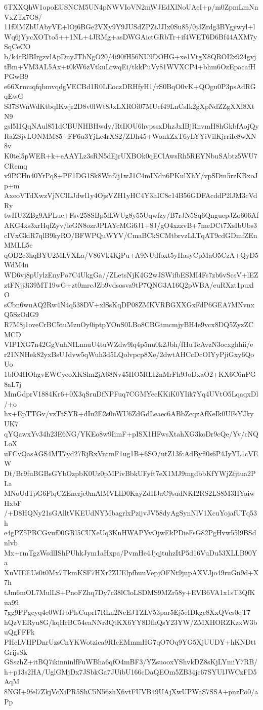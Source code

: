 6TXXQhW1opoEUSNCM5UN4pNWVIoVN2mWJEdXlNoUAeI+p/m0ZpmLmNnVxZTx7G8/
11f0lMZbUAbyVE+lOj6BGe2VXy9Y9JUSdZPZiJJIx0Su85/0j3Zrdg3BYgywyl+l
Wq6jYycXOTto5++1NL+4JRMg+asDWGAictGRbTr+if4WET6D6Bf44AXM7ySqCeCO
b/k4rRlBIrgzvlApDnyJThNgO20/4i90fH56NU9DOHG+xe1VtgX8QROI2z924gvj
tBm+VM3AL5Ax+t0kW6zVtkuLrwqEi/tkkPuVy81WVXCP4+bhm6OzEpacafHPGwB9
e66XrmuqfqbmvqdgVECBd1R0LEoczDRHfyH1/rS0BqO0vK+QOgu0P3psAdRGqEwG
S37SWnWdKtbqIKwjr2D8v0lWt8JxLXROi07MUef49LnCsIk2gXpNdZZgXXl8XtN9
gsl5I1QqNAul851dCBUNHBHwdy/RtIlOU6hvpssxDhzJxIBjRnvmH8hGkbfAojQy
RaZSjvLONMM85+FF6u3YjLe4rXS2/ZDh45+WonkZxT6yLYYiVilKjrriIc8wXN8v
K0tel5pWER+k+eAAYLz3sRN5dEjrUXBOk0qEClAwsRh5REYNbuSAbtz5WU7CRemq
v9PCHn40YrPq8+PF1DG1Sk8Wnf7j1wJ1C4mINdn6PKulXhY/vpSDm5rzKBxoJp+m
AxeoVTdXwzVjNCILJdwl1y4OjsVZH1yHC4Y3hIC8c14B56GDFAcddP2lJM3cVdRy
twHU3ZBg9APLue+Fsv258SBp5lLWUg8y55Uqwfzy/B7rJN5Sq6QnguepJZo606Af
AKG4xs3xrHqfZyv/leGN8ozrJPIAYcMGi6J1+8J/gO4xzzvB+7meDCt7XsIbUbs3
cIVxGkiR7qlB9kyRO/BFWPQuWYV/CmaBCkSCMtbrvzLLTqAT9cdGDmfZEnMMLL5c
qOD2c3hqBYU2MLVXLa/V86Vk4KjPu+A9NUdfoxt5yHasyCpMaO5CzA+QyD5WdM4n
WD6vj8pUylzEnyPo7C4UkgGa//ZLetsNjK4G2wJSWifbESMI4Fs7zb6vScsV+lEZ
ztFNjj3i39MT19wG+zt0mrcJZb9vdsosva9tP7QNG3A16Q2pWBA/euRXzt1puxlO
sCbn6wuAQ2Rw4N4q538DV+xlSsKqDP08ZMKVRBGXXGxFdP6GEA7MNvnxQ5SzOdG9
R7M8j1oveCrBC5tuMzuOy0iptpYOnS0LBo8CBGtmcmjyBH4e9vcx8DQ5ZyzZCMCD
VIP1XG7n42GgVuhNILnnuU4tuWZdw9lq4p5nu0k2Jbh/fHuTcAvzN3ocxghhii/e
r21NNHek82yxBsUJdvw5qWuh3d5LQolvpcp8Xe/2dwtAHCcDcOIYyPjiGxy6QoUo
1blO4HOhgvEWCyeoXKSlm2jA68Nv45HO5RLI2nMrFh9JoDxaO2+KX6C6nPG8aL7j
MmGdprV1884Kr6+0X3qSruDfNPFuq7CGMYecKKiK0YIik7Yq4UVtO5LqaqxDl/+o
hx+EpTTGv/vzTtSYR+dIu2E2s0nWU6ZdGdLeaec6ABbZeqzAfKeIk0UFsYJkyUK7
qYQawxYv34h23E6NG/YKEo8w9IimF+pISX1HFwsXtahXG3koDr9cQe/Yv/cNQLoX
uFCvQasAGS4MT7yd27RjRxVntmF1ug1B+6SO/utZ13fcAdByfl0s6P4JyYL1cVEW
Dt/Br9fuBGBsGYbOzpbK0Uz0pMPivBbkUFyft7eX1MJ9mgdbbKfYWjZfjtua2PLa
MNoUdTpG6FlqCZEnerjc0mAlMVLlD0KayZdHJaC9sudNKI2RS2LS8M3HYaiwHxbF
/+D8HQNy21sGAlltVKEUdNYMbagrlxPzijvJV58dyAgSynNlV1XcuYojafUTq53h
e4gPZ5PBCGvuf00GRl5CUXeUq3KnHWAPYvOjwEkPDieFsG82PgHvw55l9BSdnlvb
Mx+rmTgzWsdlIShPUhkJym1aHxpa/PvmHe4JjqjtuhzItP5d16VuDu53XLLB90Ya
XuVIEEUs0t0Mx7TkmKSF7HXr2ZUElpfhuuVepjOFNt9jupAXVJjo49ruGn9d+X7h
tJm6mOL7MulLS+PnoFZhq7Dy7c38lCloLSDMS9MZr58y+EVB6VA1x1sT3QfKua99
7gg9FPgeyq4c0WfJbPlsCuprI7RLn2NcEJTZLV53par5Ej5eIDkgc8XxQVcs0qT7
hQzVERyu8G/kqHrBC54eaNNr3QtKX6YY8DfhQsY23YW/ZMXHORZKzxW3buQgFFFk
PHcLVHPDnrUzsCnYKWotzica9RIcEMmmHG7qO7Oq9YG5XjUUDY+hKNDttGrijsSk
GSszhZ+itBQ7ikinninlfFuWBha6qfO4mBF3/YZsuooxYShvkDZ8sKjLYmiY7RB/
h+p13s2HA/UglGMjDx7JSbkGa7JUibU166cDaQEOm5ZB34jc67SYUlJWCzFD5AqM
8NGI+9fel7ZkjVcXiPR5ShC5N56zhX6vtFUVB49UAjXwUPWaS7SSA+pnzPo0/aPp
